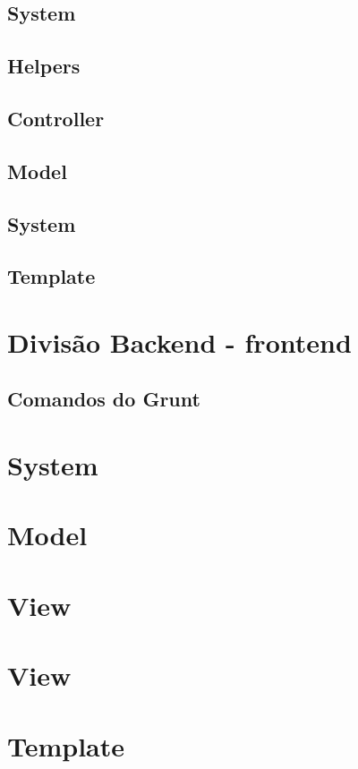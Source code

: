         \subsection{System\label{sub:system-sis}}

        \subsection{Helpers\label{sub:system-helper}}



        \subsection{Controller\label{sub:system-controller}}

        \subsection{Model\label{sub:system-model}}

        \subsection{System\label{sub:system-system}}

        \subsection{Template\label{sub:system-template}}





    \section{Divisão Backend - frontend\label{sec:back-front}}


        \subsection{Comandos do Grunt\label{sub:comandos-grunt}}

    \section{System\label{sec:estrutura-pastas}}

    \section{Model\label{sec:estrutura-pastas}}

    \section{View\label{sec:estrutura-pastas}}

    \section{View\label{sec:estrutura-pastas}}

    \section{Template\label{sec:estrutura-pastas}}
